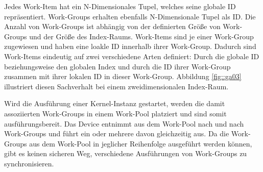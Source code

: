 Jedes Work-Item hat ein N-Dimensionales Tupel, welches seine globale ID repräsentiert.
Work-Groups erhalten ebenfalls N-Dimensionale Tupel als ID.
Die Anzahl von Work-Groups ist abhängig von der definierten Größe von Work-Groups und der Größe des Index-Raums.
Work-Items sind je einer Work-Group zugewiesen und haben eine loakle ID innerhalb ihrer Work-Group.
Dadurch sind Work-Items eindeutig auf zwei verschiedene Arten definiert: Durch die globale ID beziehungsweise den globalen Index und durch die ID ihrer Work-Group zusammen mit ihrer lokalen ID in dieser Work-Group.
Abbildung \ref{fig::ga03} illustriert diesen Sachverhalt bei einem zweidimensionalen Index-Raum.

Wird die Ausführung einer Kernel-Instanz gestartet, werden die damit assoziierten Work-Groups in einem Work-Pool platziert und sind somit ausführungsbereit.
Das Device entnimmt aus dem Work-Pool nach und nach Work-Groups und führt ein oder mehrere davon gleichzeitig aus.
Da die Work-Groups aus dem Work-Pool in jeglicher Reihenfolge ausgeführt werden können, gibt es keinen sicheren Weg, verschiedene Ausführungen von Work-Groups zu synchronisieren.

